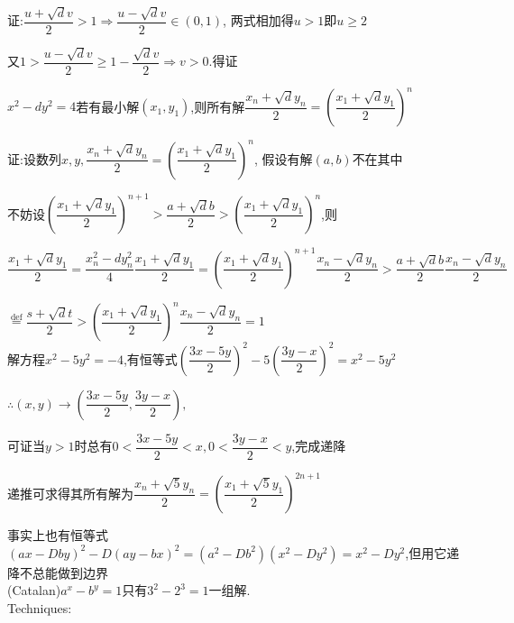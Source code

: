 证:$ \dfrac{u+\sqrt{d}v}{2}>1\Rightarrow \dfrac{u-\sqrt{d}v}{2}\in(0,1)$,
两式相加得$ u>1$即$ u\ge 2$

又$ 1>\dfrac{u-\sqrt{d}v}{2}\ge 1-\dfrac{\sqrt{d}v}{2}\Rightarrow v>0$.得证

$ x^2-dy^2=4$若有最小解$ (x_1,y_1)$,则所有解$ \dfrac{x_n+\sqrt{d}y_n}{2}=(\dfrac{x_1+\sqrt{d}y_1}{2})^n$

证:设数列$x,y, \dfrac{x_n+\sqrt{d}y_n}{2}=(\dfrac{x_1+\sqrt{d}y_1}{2})^n$,
假设有解$ (a,b)$不在其中

不妨设$ ( \dfrac{x_1+\sqrt{d}y_1}{2})^{n+1}>\dfrac{a+\sqrt{d}b}{2}>(\dfrac{x_1+\sqrt{d}y_1}{2})^n$,则

$   \dfrac{x_1+\sqrt{d}y_1}{2}=\dfrac{x_n^2-dy_n^2}{4}\dfrac{x_1+\sqrt{d}y_1}{2}=(\dfrac{x_1+\sqrt{d}y_1}{2})^{n+1}\dfrac{x_n-\sqrt{d}y_n}{2}>\dfrac{a+\sqrt{d}b}{2}\dfrac{x_n-\sqrt{d}y_n}{2} $ 

$  \overset{\text{def}}{=} \dfrac{s+\sqrt{d}t}{2}>(\dfrac{x_1+\sqrt{d}y_1}{2})^n\dfrac{x_n-\sqrt{d}y_n}{2}=1$ 
\\

解方程$ x^2-5y^2=-4$,有恒等式$ (\dfrac{3x-5y}{2})^2-5(\dfrac{3y-x}{2})^2=x^2-5y^2$

$ \therefore (x,y)\rightarrow (\dfrac{3x-5y}{2},\dfrac{3y-x}{2}),$

可证当$ y>1$时总有$ 0<\dfrac{3x-5y}{2}<x,0<\dfrac{3y-x}{2}<y$,完成递降

递推可求得其所有解为$ \dfrac{x_n+\sqrt{5}y_n}{2}=(\dfrac{x_1+\sqrt{5}y_1}{2})^{2n+1}$

事实上也有恒等式$ (ax-Dby)^2-D(ay-bx)^2=(a^2-Db^2)(x^2-Dy^2)=x^2-Dy^2$,但用它递降不总能做到边界
\\

(Catalan)$ a^x-b^y=1$只有$ 3^2-2^3=1$一组解.
\\

Techniques:

